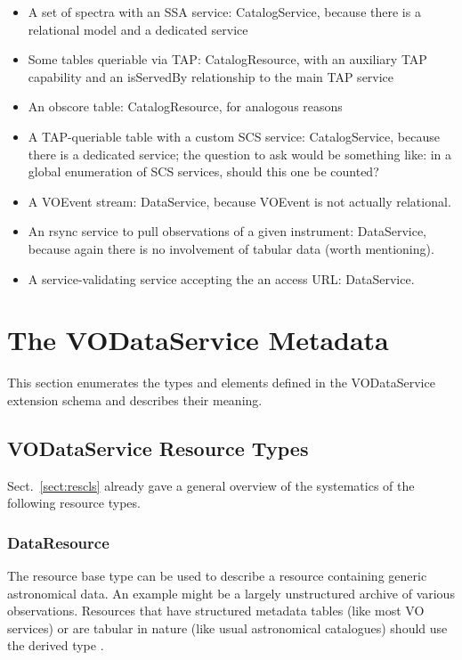 \documentclass[11pt,a4paper]{ivoa}
\begin{document}
\begin{itemize}
\item A set of spectra with an SSA service: CatalogService, because
there is a relational model and a dedicated service
\item Some tables queriable via TAP: CatalogResource, with an auxiliary
TAP capability and an isServedBy relationship to the main TAP service
\item An obscore table: CatalogResource, for analogous reasons
\item A TAP-queriable table with a custom SCS service: CatalogService,
because there is a dedicated service; the question to ask would be
something like: in a global enumeration of SCS services, should this one
be counted?
\item A VOEvent stream: DataService, because VOEvent is not actually
relational.
\item An rsync service to pull observations of a given instrument:
DataService, because again there is no involvement of tabular data
(worth mentioning).
\item A service-validating service accepting the an access URL:
DataService.
\end{itemize}

\section{The VODataService Metadata}
\label{sect:metadata}


This section enumerates the types and elements defined in the
VODataService extension schema and describes their meaning.


\subsection{VODataService Resource Types}
\label{sect:resext}

Sect.~\ref{sect:rescls} already gave a general overview of the
systematics of the following resource types.

\subsubsection{DataResource}
\label{sect:DataResource}

The  resource base type can be used to describe a
resource containing generic astronomical data.
An example might be a largely unstructured archive
of various observations.  Resources that have structured metadata tables
(like most VO services) or are tabular in nature (like usual
astronomical catalogues) should use the derived type .
\end{document}
